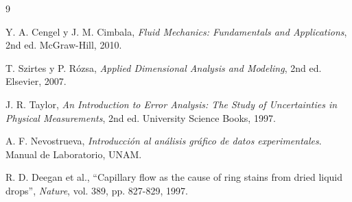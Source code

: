 \documentclass[12pt, letterpaper, onecolumn]{article}
\begin{document}
\begin{thebibliography}{9}

Y. A. Cengel y J. M. Cimbala, 
\textit{Fluid Mechanics: Fundamentals and Applications}, 2nd ed. 
McGraw-Hill, 2010.

T. Szirtes y P. Rózsa, 
\textit{Applied Dimensional Analysis and Modeling}, 2nd ed. 
Elsevier, 2007.

J. R. Taylor, 
\textit{An Introduction to Error Analysis: The Study of Uncertainties in Physical Measurements}, 2nd ed. 
University Science Books, 1997.

A. F. Nevostrueva, 
\textit{Introducción al análisis gráfico de datos experimentales}. 
Manual de Laboratorio, UNAM.

R. D. Deegan et al., 
``Capillary flow as the cause of ring stains from dried liquid drops'', 
\textit{Nature}, vol. 389, pp. 827-829, 1997.

\end{thebibliography}
\end{document}
